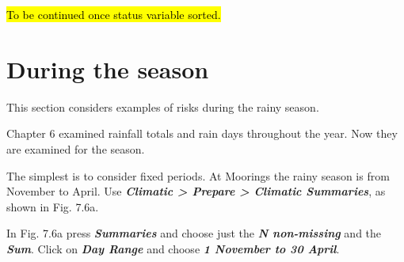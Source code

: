 \documentclass[
  letterpaper,
  DIV=11,
  numbers=noendperiod]{scrreprt}
\begin{document}
\hl{To be continued once status variable sorted.}

\section{During the season}\label{during-the-season}

This section considers examples of risks during the rainy season.

Chapter 6 examined rainfall totals and rain days throughout the year.
Now they are examined for the season.

The simplest is to consider fixed periods. At Moorings the rainy season
is from November to April. Use \textbf{\emph{Climatic \textgreater{}
Prepare \textgreater{} Climatic Summaries}}, as shown in Fig. 7.6a.

In Fig. 7.6a press \textbf{\emph{Summaries}} and choose just the
\textbf{\emph{N non-missing}} and the \textbf{\emph{Sum}}. Click on
\textbf{\emph{Day Range}} and choose \textbf{\emph{1 November to 30
April}}.
\end{document}
